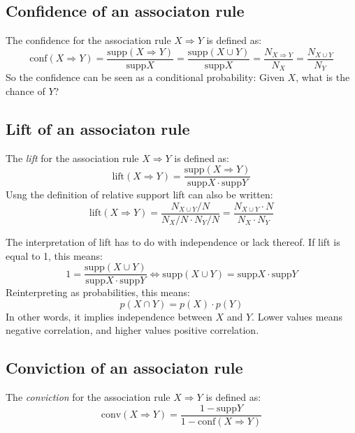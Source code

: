 \documentclass[12pt, a4paper]{article}
\numberwithin{equation}{section}
\begin{document}
\subsection{Confidence of an associaton rule}
The confidence for the association rule $X\Rightarrow Y$ is defined as:
\begin{equation}
\textrm{conf}(X\Rightarrow Y)=\frac{\textrm{supp}(X\Rightarrow Y)}{\textrm{supp}X}=\frac{\textrm{supp}(X\cup Y)}{\textrm{supp}X}=\frac{N_{X\Rightarrow Y}}{N_X}=\frac{N_{X\cup Y}}{N_Y}
\end{equation}
So the confidence can be seen as a conditional probability: Given $X$, what is the chance of $Y$?

\subsection{Lift of an associaton rule}
The \textit{lift} for the association rule $X\Rightarrow Y$ is defined as:
\begin{equation}
\textrm{lift}(X\Rightarrow Y)=\frac{\textrm{supp}(X\Rightarrow Y)}{\textrm{supp}X\cdot\textrm{supp}Y}
\end{equation}
Usng the definition of relative support lift can also be written:
\begin{equation}
\textrm{lift}(X\Rightarrow Y)=\frac{N_{X\cup Y}/N}{N_X/N\cdot N_Y/N}=\frac{N_{X\cup Y}\cdot N}{N_X\cdot N_Y}
\end{equation}

The interpretation of lift has to do with independence or lack thereof. If lift is equal to 1, this means:
\begin{equation}
1=\frac{\textrm{supp}(X\cup Y)}{\textrm{supp}X\cdot\textrm{supp}Y}\Leftrightarrow\textrm{supp}(X\cup Y)=\textrm{supp}X\cdot\textrm{supp}Y
\end{equation}
Reinterpreting as probabilities, this means:
\begin{equation}
p(X\cap Y)=p(X)\cdot p(Y)
\end{equation}
In other words, it implies independence between $X$ and $Y$. Lower values means negative correlation, and higher values positive correlation.

\subsection{Conviction of an associaton rule}
The \textit{conviction} for the association rule $X\Rightarrow Y$ is defined as:
\begin{equation}
\textrm{conv}(X\Rightarrow Y)=\frac{1-\textrm{supp}Y}{1-\textrm{conf}(X\Rightarrow Y)}
\end{equation}
\end{document}
